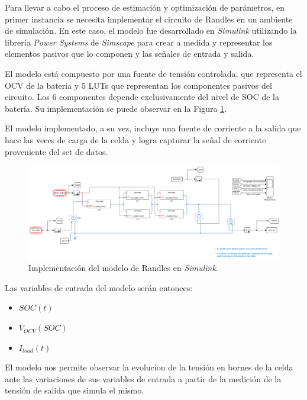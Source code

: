 \documentclass[10pt, a4paper]{article}
\begin{document}
Para llevar a cabo el proceso de estimación y optimizaci\'on de par\'ametros, en
primer instancia se necesita implementar el circuito de Randles en un ambiente
de simulaci\'on. En este caso, el modelo fue desarrollado en \emph{Simulink}
utilizando la librer\'ia \emph{Power Systems} de \emph{Simscape} para crear a
medida y representar los elementos pasivos que lo componen y las señales de
entrada y salida.

El modelo est\'a compuesto por una fuente de tensi\'on controlada, que
representa el \acrshort{OCV} de la bater\'ia y 5 \acrshort{LUT}s que
representan los componentes pasivos del circuito. Los 6 componentes depende
exclusivamente del nivel de \acrshort{SOC} de la bater\'ia. Su implementaci\'on
se puede observar en la Figura \ref{battery_model_simulink}. 

El modelo implementado, a su vez, incluye una fuente de corriente a la salida
que hace las veces de carga de la celda y logra capturar la señal de corriente
proveniente del set de datos.

\begin{figure}[h!]
    \begin{center}
        \includegraphics[width=.9\textwidth]{battery_model_simulink.png}
        \caption{Implementaci\'on del modelo de Randles en \emph{Simulink}.}
        \label{battery_model_simulink}
    \end{center}
\end{figure}
\FloatBarrier

Las variables de entrada del modelo serán entonces: 

\begin{itemize}
    \item $SOC(t)$
    \item $V_{OCV}(SOC)$
    \item $I_{load}(t)$
\end{itemize}

El modelo nos permite observar la evolucíon de la tensión en bornes de la celda
ante las variaciones de sus variables de entrada a partir de la medición de la
tensi\'on de salida que simula el mismo.
\end{document}
